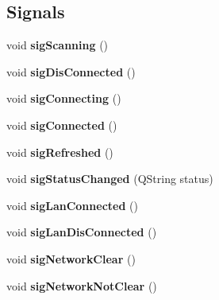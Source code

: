 \subsection*{Signals}
\begin{DoxyCompactItemize}
\item 
\mbox{\label{class_q_qt_ethenet_manager_a9e32134b4fb3a3986d6e89ed2471ebd3}} 
void {\bfseries sig\+Scanning} ()
\item 
\mbox{\label{class_q_qt_ethenet_manager_acdc4c4de399cea78bc0f3baae9314554}} 
void {\bfseries sig\+Dis\+Connected} ()
\item 
\mbox{\label{class_q_qt_ethenet_manager_a29f51ac158bc7dc360962b7fa05ecc7b}} 
void {\bfseries sig\+Connecting} ()
\item 
\mbox{\label{class_q_qt_ethenet_manager_a62eedfc563941f2326d99f7b702e4f82}} 
void {\bfseries sig\+Connected} ()
\item 
\mbox{\label{class_q_qt_ethenet_manager_a8f7dc6cb625cf767602f96ca8e66ef70}} 
void {\bfseries sig\+Refreshed} ()
\item 
\mbox{\label{class_q_qt_ethenet_manager_a6e36d6af1b87ef9fab2023e7e6c76b27}} 
void {\bfseries sig\+Status\+Changed} (Q\+String status)
\item 
\mbox{\label{class_q_qt_ethenet_manager_a3ab61e173072fa7d9e1de386d5404956}} 
void {\bfseries sig\+Lan\+Connected} ()
\item 
\mbox{\label{class_q_qt_ethenet_manager_a733c3bbc21d85d4bd284598466d7120c}} 
void {\bfseries sig\+Lan\+Dis\+Connected} ()
\item 
\mbox{\label{class_q_qt_ethenet_manager_aa72eceec1be28fd06dc35efe4069964c}} 
void {\bfseries sig\+Network\+Clear} ()
\item 
\mbox{\label{class_q_qt_ethenet_manager_ae9bb42c6d5bae1c8c7be72d2c2eeba4c}} 
void {\bfseries sig\+Network\+Not\+Clear} ()
\end{DoxyCompactItemize}
